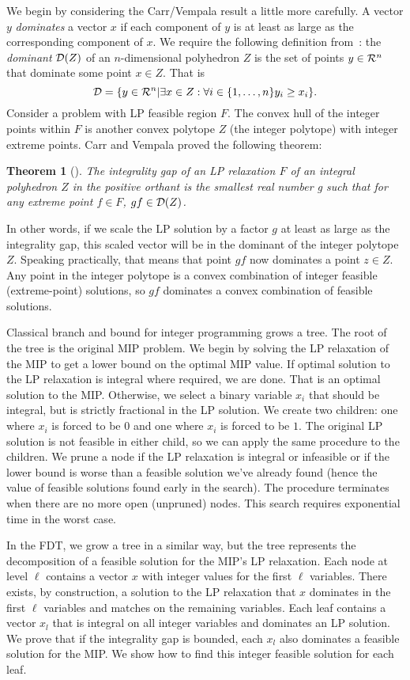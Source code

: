 \documentclass[11pt]{article}
\newtheorem{theorem}{Theorem}
\begin{document}
We begin by considering the Carr/Vempala result a little more
carefully.  A vector $y$ {\em dominates} a vector $x$ if each
component of $y$ is at least as large as the corresponding component
of $x$.  We require the following definition from~\cite{CarrVempala}: the
{\em dominant} ${\cal D}(Z)$ of an $n$-dimensional polyhedron $Z$ is
the set of points $y \in {\cal R}^n$ that dominate some point $x \in
Z$.  That is
$$ {\cal D} = \{y \in {\cal R}^n | \exists x \in Z: \forall i \in \{1,
\ldots, n\} y_i \ge x_i\}.$$ Consider a problem with LP feasible
region $F$.  The convex hull of the integer points within $F$ is
another convex polytope $Z$ (the integer polytope) with integer
extreme points.  Carr and Vempala proved the following theorem:
\begin{theorem}[\cite{CarrVempala}]
The integrality gap of an LP relaxation $F$ of an integral polyhedron $Z$ in the
positive orthant is the smallest real number g such that for any
extreme point $f \in F$, $gf \in {\cal D}(Z)$.
\label{thm:CV}
\end{theorem}
In other words, if we scale the LP solution by a factor $g$ at least
as large as the integrality gap, this scaled vector will be in the
dominant of the integer polytope $Z$.  Speaking practically, that
means that point $gf$ now dominates a point $z \in Z$.  Any point in
the integer polytope is a convex combination of integer feasible
(extreme-point) solutions, so $gf$ dominates a convex combination of
feasible solutions.

Classical branch and bound for integer programming grows a tree.  The
root of the tree is the original MIP problem.  We begin by solving the
LP relaxation of the MIP to get a lower bound on the optimal MIP
value.  If optimal solution to the LP relaxation is integral where
required, we are done.  That is an optimal solution to the MIP.
Otherwise, we select a binary variable $x_i$ that should be integral,
but is strictly fractional in the LP solution.  We create two
children: one where $x_i$ is forced to be $0$ and one where $x_i$ is
forced to be $1$.  The original LP solution is not feasible in either
child, so we can apply the same procedure to the children.  We prune a
node if the LP relaxation is integral or infeasible or if the lower
bound is worse than a feasible solution we've already found (hence the
value of feasible solutions found early in the search).  The procedure
terminates when there are no more open (unpruned) nodes.  This search
requires exponential time in the worst case.

In the FDT, we grow a tree in a similar way, but the tree represents
the decomposition of a feasible solution for the MIP's LP relaxation.
Each node at level $\ell$ contains a vector $x$ with integer values
for the first $\ell$ variables.  There exists, by construction, a
solution to the LP relaxation that $x$ dominates in the first $\ell$
variables and matches on the remaining variables.  Each leaf contains
a vector $x_l$ that is integral on all integer variables and dominates
an LP solution.  We prove that if the integrality gap is bounded, each
$x_l$ also dominates a feasible solution for the MIP.  We show how to
find this integer feasible solution for each leaf.
\end{document}
